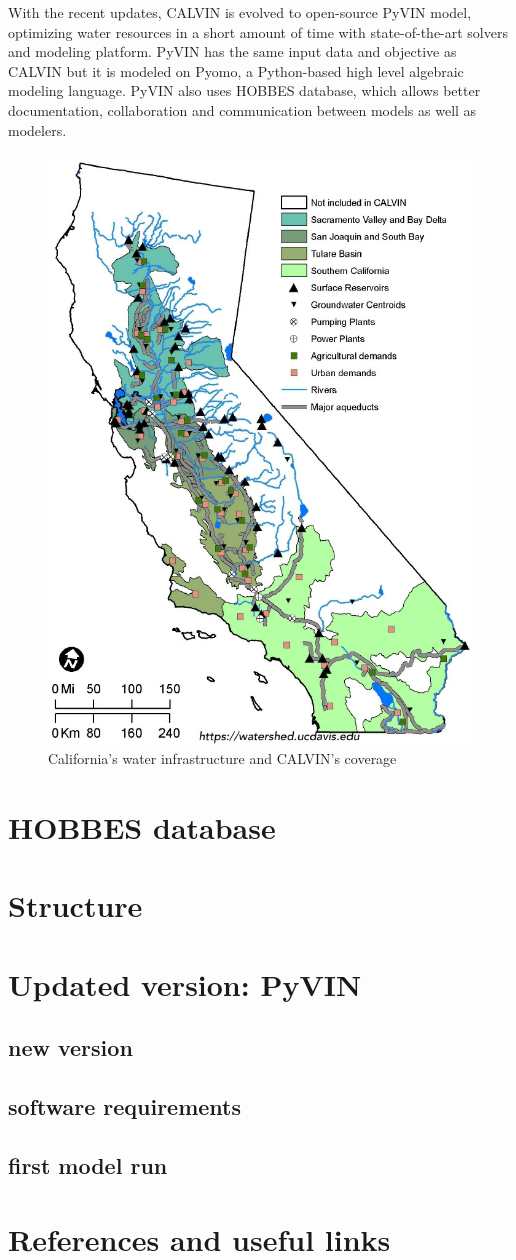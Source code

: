 \documentclass[12pt]{article}%
\begin{document}
%
\par With the recent updates, CALVIN is evolved to open-source PyVIN model, optimizing water resources in a short amount of time with state-of-the-art solvers and modeling platform. PyVIN has the same input data and objective as CALVIN but it is modeled on Pyomo, a Python-based high level algebraic modeling language. PyVIN also uses HOBBES database, which allows better documentation, collaboration and communication between models as well as modelers.
%
\begin{figure}[H]
    \centering
    \includegraphics[width=0.9\linewidth]{coverage.pdf}
    \caption{California's water infrastructure and CALVIN's coverage}
    \label{fig:coverage}
\end{figure}
%
\section{HOBBES database}
%
\section{Structure}
%
\section{Updated version: PyVIN}
%
\subsection{new version}
%
\subsection{software requirements}
%
\subsection{first model run}
%
\section{References and useful links}
\end{document}
